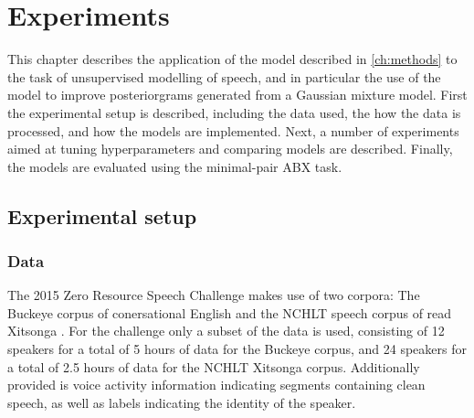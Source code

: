 %
%
%

\chapter{Experiments}
\label{ch:experiments}

This chapter describes the application of the model described in \cref{ch:methods} to the task of unsupervised modelling of speech, and in particular the use of the model to improve posteriorgrams generated from a Gaussian mixture model.
First the experimental setup is described, including the data used, the how the data is processed, and how the models are implemented.
Next, a number of experiments aimed at tuning hyperparameters and comparing models are described.
Finally, the models are evaluated using the minimal-pair ABX task.

\section{Experimental setup}
\subsection{Data}
The 2015 Zero Resource Speech Challenge makes use of two corpora: The Buckeye corpus of conersational English \parencite{buckeyecorpus} and the NCHLT speech corpus of read Xitsonga \parencite{barnard2014nchlt}.
For the challenge only a subset of the data is used, consisting of 12 speakers for a total of 5 hours of data for the Buckeye corpus, and 24 speakers for a total of 2.5 hours of data for the NCHLT Xitsonga corpus.
Additionally provided is voice activity information indicating segments containing clean speech, as well as labels indicating the identity of the speaker.

